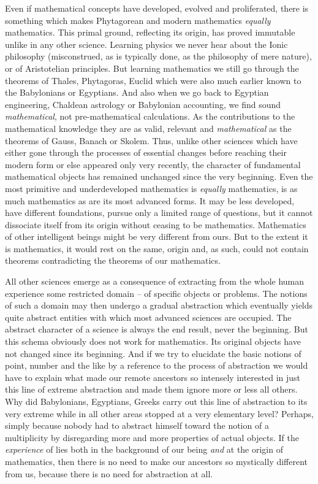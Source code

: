 Even if mathematical concepts have developed, evolved and proliferated, there is
something which makes Phytagorean and modern mathematics {\em equally}
mathematics.  This primal ground, reflecting its origin, has proved immutable
unlike in any other science.  Learning physics we never hear about the Ionic
philosophy (misconstrued, as is typically done, as the philosophy of mere
nature), or of Aristotelian principles.  But learning mathematics we still go
through the theorems of Thales, Phytagoras, Euclid which were also much earlier
known to the Babylonians or Egyptians. And also when we go back to Egyptian
engineering, Chaldean astrology or Babylonian accounting, we find sound {\em
  mathematical}, not pre-mathematical calculations.  As the contributions to the
mathematical knowledge they are as valid, relevant and {\em mathematical} as the
theorems of Gauss, Banach or Skolem.  Thus, unlike other sciences which have
either gone through the processes of essential changes before reaching their
modern form or else appeared only very recently, the character of fundamental
mathematical objects has remained unchanged since the very beginning. Even the
most primitive and underdeveloped mathematics is {\em equally} mathematics, is
as much mathematics as are its most advanced forms.  It may be less developed,
have different foundations, pursue only a limited range of questions, but it
cannot dissociate itself from its origin without ceasing to be mathematics.
Mathematics of other intelligent beings might be very different from ours. But
to the extent it is mathematics, it would rest on the same,  origin
and, as such, could not contain theorems contradicting the theorems of our
mathematics.

\newpa
 All other sciences emerge as a consequence of extracting from
the whole human experience some restricted domain -- of specific objects or
problems.  The notions of such a domain may then undergo a gradual abstraction
which eventually yields quite abstract entities with which most advanced
sciences are occupied.  The abstract character of a science is always the end
result, never the beginning.  But this schema obviously does not work for
mathematics.  Its original objects have not changed since its beginning.  And if
we try to elucidate the basic notions of point, number and the like by a
reference to the process of abstraction we would have to explain what made our
remote ancestors so intensely interested in just this line of extreme
abstraction and made them ignore more or less all others. Why did Babylonians,
Egyptians, Greeks carry out this line of abstraction to its very extreme while
in all other areas stopped at a very elementary level? Perhaps, simply because
nobody had to abstract himself toward the notion of a multiplicity by
disregarding more and more properties of actual objects.  If the {\em
  experience} of  lies both in the background of our being
{\em and} at the origin of mathematics, then there is no need to make our
ancestors so mystically different from us, because there is no need for
abstraction at all.

